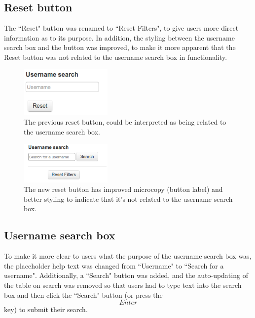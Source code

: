 \subsection{Reset button}
The ``Reset" button was renamed to ``Reset Filters", to give users more direct information \citep[p. 520]{Galitz} as to its purpose. In addition, the styling between the username search box and the button was improved, to make it more apparent that the Reset button was not related to the username search box in functionality. 
\begin{figure}[h!]
    \centering
    \includegraphics[width=0.4\textwidth]{Figures/V2/oldreset.png}
 \caption{The previous reset button, could be interpreted as being related to the username search box.}
\end{figure}

\begin{figure}[h!]
    \centering
    \includegraphics[width=0.4\textwidth]{Figures/V2/newreset.png}
 \caption{The new reset button has improved microcopy (button label) and better styling to indicate that it’s not related to the username search box.}
\end{figure}


\subsection{Username search box}
To make it more clear to users what the purpose of the username search box was, the placeholder help text was changed from ``Username" to ``Search for a username". Additionally, a ``Search" button was added, and the auto-updating of the table on search was removed so that users had to type text into the search box and then click the ``Search" button (or press the \[Enter\] key) to submit their search. 

